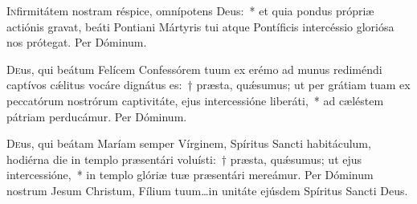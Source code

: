 \documentclass[vesperale_romanum]{subfiles}
\begin{document}
\lettrine{I}{n}firmitátem nostram réspice, omnípotens Deus:~* et quia pondus própriæ actiónis gravat, beáti Pontiani Mártyris tui atque Pontíficis intercéssio gloriósa nos prótegat.
Per Dóminum.

\capitdeseq

\myrule


\duplexmtv

\oratio

\lettrine{D}{e}us, qui beátum Felícem Confessórem tuum ex erémo ad munus rediméndi captívos cǽlitus vocáre dignátus es:~† præsta, quǽsumus; ut per grátiam tuam ex peccatórum nostrórum captivitáte, ejus intercessióne liberáti,~* ad cæléstem pátriam perducámur. Per Dóminum.


\vespsequentiscomm

\myrule



\duplexmajus




\oratio

\lettrine{D}{e}us, qui beátam Maríam semper Vírginem, Spíritus Sancti habitáculum, hodiérna die in templo præsentári voluísti:~† præsta, quǽsumus; ut ejus intercessióne,~* in templo glóriæ tuæ præsentári mereámur.
Per Dóminum nostrum Jesum Christum, Fílium tuum…in unitáte ejúsdem Spíritus Sancti Deus.



\commsequentis

\myrule

\end{document}
